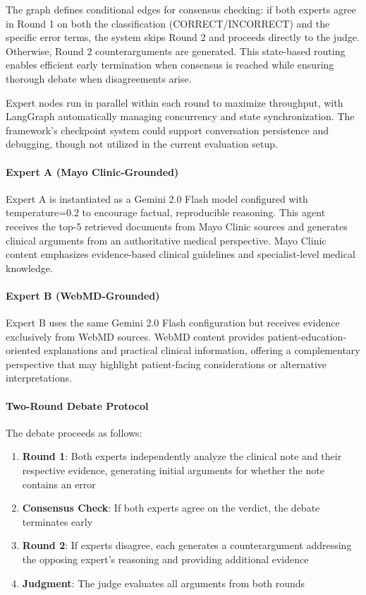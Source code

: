 \documentclass[11pt]{article}
\begin{document}
The graph defines conditional edges for consensus checking: if both experts agree in Round 1 on both the classification (CORRECT/INCORRECT) and the specific error terms, the system skips Round 2 and proceeds directly to the judge. Otherwise, Round 2 counterarguments are generated. This state-based routing enables efficient early termination when consensus is reached while ensuring thorough debate when disagreements arise.

Expert nodes run in parallel within each round to maximize throughput, with LangGraph automatically managing concurrency and state synchronization. The framework's checkpoint system could support conversation persistence and debugging, though not utilized in the current evaluation setup.

\paragraph{Expert A (Mayo Clinic-Grounded)}
Expert A is instantiated as a Gemini 2.0 Flash model configured with temperature=0.2 to encourage factual, reproducible reasoning. This agent receives the top-5 retrieved documents from Mayo Clinic sources and generates clinical arguments from an authoritative medical perspective. Mayo Clinic content emphasizes evidence-based clinical guidelines and specialist-level medical knowledge.

\paragraph{Expert B (WebMD-Grounded)}
Expert B uses the same Gemini 2.0 Flash configuration but receives evidence exclusively from WebMD sources. WebMD content provides patient-education-oriented explanations and practical clinical information, offering a complementary perspective that may highlight patient-facing considerations or alternative interpretations.

\paragraph{Two-Round Debate Protocol}
The debate proceeds as follows:
\begin{enumerate}
    \item \textbf{Round 1}: Both experts independently analyze the clinical note and their respective evidence, generating initial arguments for whether the note contains an error
    \item \textbf{Consensus Check}: If both experts agree on the verdict, the debate terminates early
    \item \textbf{Round 2}: If experts disagree, each generates a counterargument addressing the opposing expert's reasoning and providing additional evidence
    \item \textbf{Judgment}: The judge evaluates all arguments from both rounds
\end{enumerate}
\end{document}

